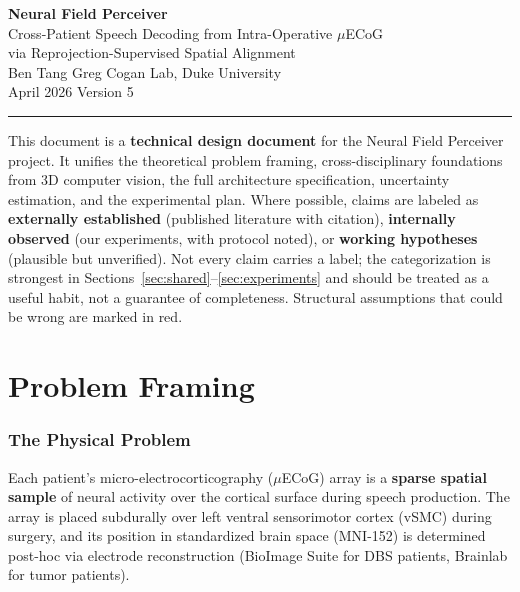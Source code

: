 \documentclass[11pt,letterpaper]{article}
\begin{document}
\begin{center}
{\LARGE\bfseries Neural Field Perceiver}\\[6pt]
{\large Cross-Patient Speech Decoding from Intra-Operative $\mu$ECoG\\via Reprojection-Supervised Spatial Alignment}\\[12pt]
{\normalsize Ben Tang \quad\textbar\quad Greg Cogan Lab, Duke University}\\[4pt]
{\normalsize April 2026 \quad\textbar\quad Version 5}
\end{center}

\medskip\noindent\rule{\textwidth}{0.4pt}\medskip

\noindent This document is a \textbf{technical design document} for the Neural Field Perceiver project.
It unifies the theoretical problem framing, cross-disciplinary foundations from 3D computer vision,
the full architecture specification, uncertainty estimation, and the experimental plan.
Where possible, claims are labeled as \textbf{externally established}
(published literature with citation), \textbf{internally observed} (our experiments, with protocol
noted), or \textbf{working hypotheses} (plausible but unverified). Not every claim carries a label;
the categorization is strongest in Sections~\ref{sec:shared}--\ref{sec:experiments} and should be
treated as a useful habit, not a guarantee of completeness.
Structural assumptions that could be wrong are marked in \textcolor{BrickRed}{red}.

\tableofcontents
\newpage



\part{Problem Framing}

\section{The Physical Problem}

Each patient's micro-electrocorticography ($\mu$ECoG) array is a \textbf{sparse spatial sample} of neural activity over the cortical surface during speech production. The array is placed subdurally over left ventral sensorimotor cortex (vSMC) during surgery, and its position in standardized brain space (MNI-152) is determined post-hoc via electrode reconstruction (BioImage Suite for DBS patients, Brainlab for tumor patients).
\end{document}

